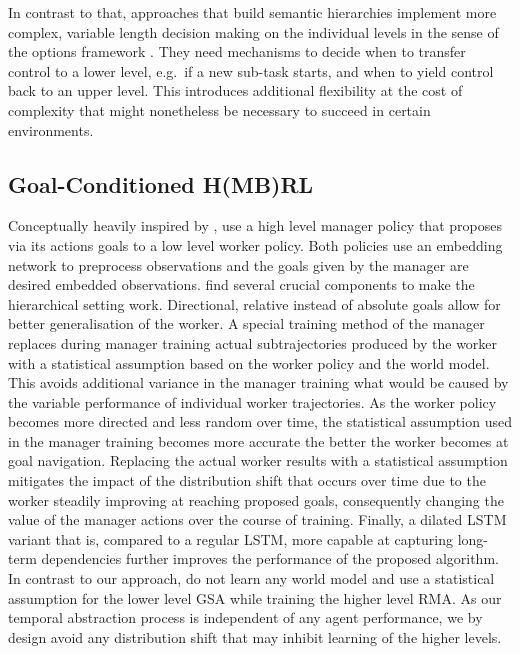 \documentclass{article}
\begin{document}
In contrast to that, approaches that build semantic hierarchies implement more complex, variable length decision making on the individual levels in the sense of the options framework \citep{sutton1999between}. They need mechanisms to decide when to transfer control to a lower level, e.g.\ if a new sub-task starts, and when to yield control back to an upper level. This introduces additional flexibility at the cost of complexity that might nonetheless be necessary to succeed in certain environments.

\subsection{Goal-Conditioned H(MB)RL}


Conceptually heavily inspired by \citet{dayan1993feudal}, \citet{vezhnevets2017feudal} use a high level manager policy that proposes via its actions goals to a low level worker policy. Both policies use an embedding network to preprocess observations and the goals given by the manager are desired embedded observations.
\citet{vezhnevets2017feudal} find several crucial components to make the hierarchical setting work. Directional, relative instead of absolute goals allow for better generalisation of the worker. A special training method of the manager replaces during manager training actual subtrajectories produced by the worker with a statistical assumption based on the worker policy and the world model. This avoids additional variance in the manager training what would be caused by the variable performance of individual worker trajectories. As the worker policy becomes more directed and less random over time, the statistical assumption used in the manager training becomes more accurate the better the worker becomes at goal navigation. %
Replacing the actual worker results with a statistical assumption mitigates the impact of the distribution shift that occurs over time due to the worker steadily improving at reaching proposed goals, consequently changing the value of the manager actions over the course of training. Finally, a dilated LSTM variant that is, compared to a regular LSTM, more capable at capturing long-term dependencies further improves the performance of the proposed algorithm. In contrast to our approach, \citet{vezhnevets2017feudal} do not learn any world model and use a statistical assumption for the lower level GSA while training the higher level RMA. As our temporal abstraction process is independent of any agent performance, we by design avoid any distribution shift that may inhibit learning of the higher levels.
\end{document}
